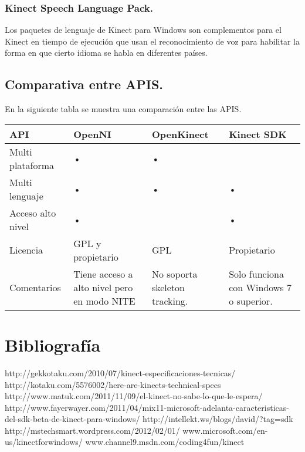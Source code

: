 \documentclass[11pt,a4paper]{article}
\begin{document}
\subsubsection{Kinect Speech Language Pack.}
Los paquetes de lenguaje de Kinect para Windows son complementos para el Kinect en tiempo de ejecución que usan el reconocimiento de voz para habilitar la forma en que cierto idioma se habla en diferentes países.

\subsection{Comparativa entre APIS.}
En la siguiente tabla se muestra una comparación entre las APIS.
\begin{tabular}{||p{2.5cm}||p{2.5cm}||p{2.5cm}||p{2.5cm}||}
\hline API & OpenNI & OpenKinect & Kinect SDK \\ 
\hline Multi plataforma & • & • &  \\ 
\hline Multi lenguaje & • & • & • \\ 
\hline Acceso alto nivel & • &  & • \\ %
\hline Licencia & GPL y propietario & GPL & Propietario \\ 
\hline Comentarios & Tiene acceso a alto nivel pero en modo NITE & No soporta skeleton tracking. & Solo funciona con Windows 7 o superior. \\ 
\hline 
\end{tabular} 


\section{Bibliografía}
http://gekkotaku.com/2010/07/kinect-especificaciones-tecnicas/
\newline
http://kotaku.com/5576002/here-are-kinects-technical-specs
\newline 
http://www.matuk.com/2011/11/09/el-kinect-no-sabe-lo-que-le-espera/
\newline
http://www.fayerwayer.com/2011/04/mix11-microsoft-adelanta-caracteristicas-del-sdk-beta-de-kinect-para-windows/
\newline
http://intellekt.ws/blogs/david/?tag=sdk
\newline
http://mstechsmart.wordpress.com/2012/02/01/
\newline
www.microsoft.com/en-us/kinectforwindows/
\newline
www.channel9.msdn.com/coding4fun/kinect
\end{document}
